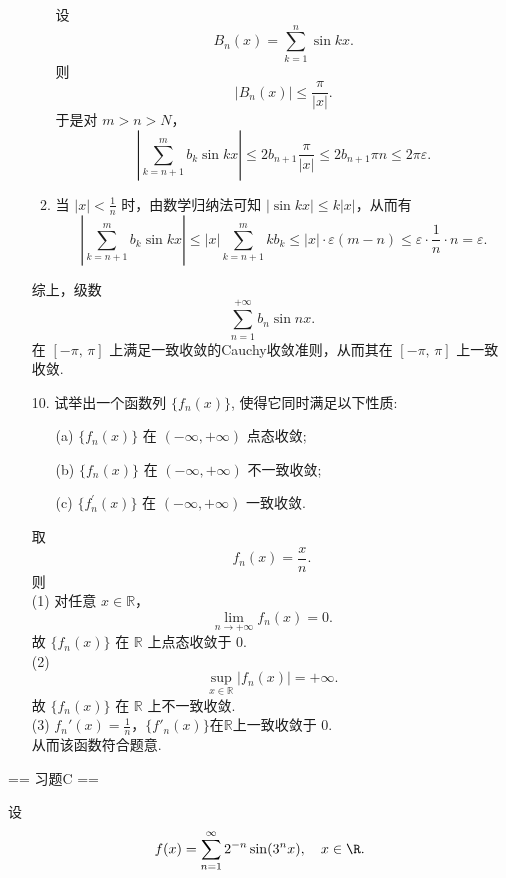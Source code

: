 \begin{enumerate}
\begin{solution}
\begin{enumerate}
        设 
        \[
        B_n(x)=\sum_{k=1}^{n} \sin kx.
        \]
        则 
        \[
        |B_n(x)|\le \frac{\pi}{|x|}.
        \]
        于是对 $m>n>N$，
        \[
        \left|\sum_{k=n+1}^{m} b_k \sin kx\right| \le 2b_{n+1} \frac{\pi}{|x|} \le 2b_{n+1} \pi n \le 2\pi \varepsilon.
        \]
        \item 当 $\displaystyle |x|<\frac{1}{n}$ 时，由数学归纳法可知 $\left|\sin kx\right|\le k\left|x\right|$，从而有
        \[
        \left|\sum_{k=n+1}^{m} b_k \sin kx\right| \le |x| \sum_{k=n+1}^{m} k b_k \le |x| \cdot \varepsilon (m-n) \le \varepsilon \cdot \frac{1}{n} \cdot n = \varepsilon.
        \]
        \end{enumerate}
        综上，级数
        \[
        \sum_{n=1}^{+\infty}b_n\sin nx.
        \]
        在 $[-\pi,\,\pi]$ 上满足一致收敛的Cauchy收敛准则，从而其在 $[-\pi,\,\pi]$ 上一致收敛.
    \end{solution}

    \item[10.]试举出一个函数列 \(\{f_{n}(x)\}\), 使得它同时满足以下性质:
    \begin{enumerate}
        \item[(a)]\(\displaystyle\{f_{n}(x)\}\) 在 \((- \infty, + \infty)\) 点态收敛;
        \item[(b)]\(\displaystyle\{f_{n}(x)\}\) 在 \((- \infty, + \infty)\) 不一致收敛;
        \item[(c)]\(\displaystyle \{f_{n}^{\prime}(x)\}\) 在 \((- \infty, + \infty)\) 一致收敛.
    \end{enumerate}
    \begin{solution}
        取 
        \[
        f_n(x) = \frac{x}{n}.
        \]则\\
        (1) 对任意 $x\in\mathbb{R}$，
        \[
        \lim_{n\to+\infty} f_n(x)=0.
        \]
        故 $\{f_n(x)\}$ 在 $\mathbb{R}$ 上点态收敛于 0.\\
        (2) 
        \[
        \sup_{x\in\mathbb{R}} |f_n(x)| = +\infty.
        \]
        故 $\{f_n(x)\}$ 在 $\mathbb{R}$ 上不一致收敛.\\
        (3) $\displaystyle f_n'(x) = \frac{1}{n}$，$\{f'_n(x)\}$在$\mathbb{R}$上一致收敛于 0.\\
        从而该函数符合题意.
    \end{solution}
\end{enumerate}

== 习题C ==

设
\[
\displaystyle f(x)=\sum_{n=1}^{\infty}2^{-n}\sin(3^{n}x),\quad x\in\R.
\]

